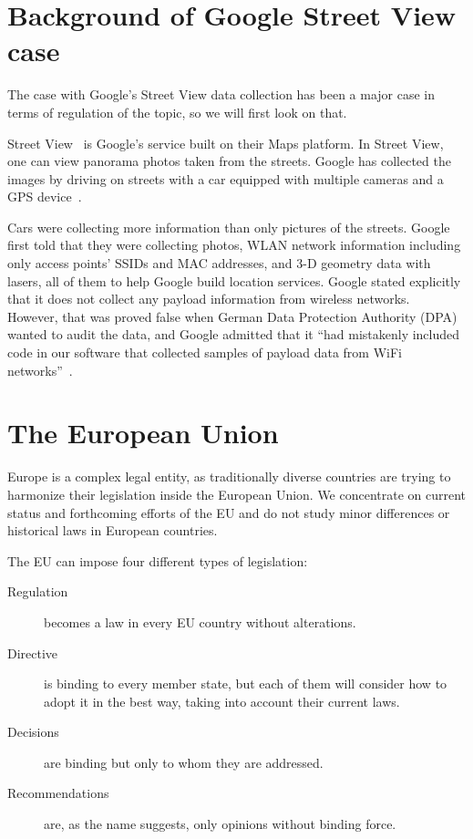 \documentclass[12pt,a4paper,oneside,pdftex]{report}
\begin{document}
\section{Background of Google Street View case}
\label{sec:streetview}

The case with Google's Street View data collection has been a major case in terms of regulation of the topic, so we will first look on that. 

Street View~\cite{googlestreetview} is Google's service built on their Maps platform. In Street View, one can view panorama photos taken from the streets. Google has collected the images by driving on streets with a car equipped with multiple cameras and a GPS device~\cite{streetview_behindscenes}.

Cars were collecting more information than only pictures of the streets. Google first told that they were collecting photos, WLAN network information including only access points' SSIDs and MAC addresses, and 3-D geometry data with lasers, all of them to help Google build location services. Google stated explicitly that it does not collect any payload information from wireless networks.~\cite{fleischer_datacollected,google_wifi_collection} However, that was proved false when German Data Protection Authority (DPA) wanted to audit the data, and Google admitted that it ``had mistakenly included code in our software that collected samples of payload data from WiFi networks''~\cite{eustace_datacollected}.

\section{The European Union}
\label{sec:legal_europe}

Europe is a complex legal entity, as traditionally diverse countries are trying to harmonize their legislation inside the European Union. We concentrate on current status and forthcoming efforts of the EU and do not study minor differences or historical laws in European countries.

The EU can impose four different types of legislation:~\cite{lisbon_288}
\begin{description}
     \item[Regulation] becomes a law in every EU country without alterations.
     \item[Directive] is binding to every member state, but each of them will consider how to adopt it in the best way, taking into account their current laws.
     \item[Decisions] are binding but only to whom they are addressed.
     \item[Recommendations] are, as the name suggests, only opinions without binding force.
\end{description}
\end{document}

